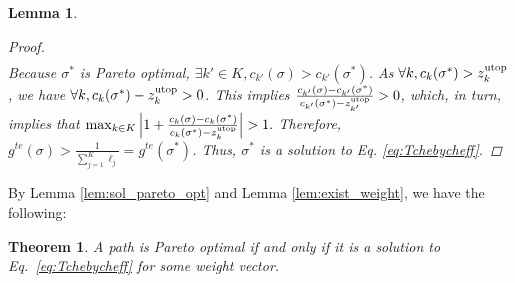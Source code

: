 \documentclass{article}
\newtheorem{thm}{Theorem}
\newtheorem{lem}{Lemma}
\begin{document}
\begin{lem}
\begin{proof}
\begin{eqnarray*}
\end{eqnarray*}
%
Because $ \sigma^{*} $ is Pareto optimal,
$\exists k' \in K, c_{k'} ( \sigma ) >  c_{k'} ( \sigma^{*} )$.
As $ \forall k,  c_{k}( \sigma^{*} ) > z^{\rm utop}_{k} $,
we have $ \forall k,  c_{k}( \sigma^{*} ) - z^{\rm utop}_{k} > 0 $.
This implies
$\frac{ c_{k'}( \sigma ) - c_{k'} ( \sigma^{*} )  }{  c_{k'} ( \sigma^{*} ) - z^{\rm utop}_{k'} }  > 0$,
which, in turn, implies that
$
\max_{k \in K} \left| 1 + \frac{ c_{k}( \sigma ) - c_{k} ( \sigma^{*} )  }{  c_{k} ( \sigma^{*} ) - z^{\rm utop}_{k} } \right| > 1.
$ %
Therefore,
$
g^{te} ( \sigma ) >  \frac{1}{\sum_{j=1}^K \ell_j} = g^{te} ( \sigma^{*} )$.
Thus, $  \sigma^{*} $ is a solution to Eq. \eqref{eq:Tchebycheff}.

\end{proof}
\end{lem}

By Lemma \ref{lem:sol_pareto_opt} and Lemma \ref{lem:exist_weight}, we have the following:

\begin{thm}
\label{thm:moo-d:rrt}
A path is Pareto optimal if and only if it is a solution to Eq.~\eqref{eq:Tchebycheff} for some weight vector.
\end{thm}
\end{document}
